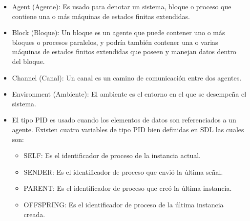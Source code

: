 \begin{itemize}
 \item Agent (Agente): Es usado para denotar un sistema, bloque o 
proceso que contiene una o m\'as m\'aquinas de estados finitas extendidas.
\item Block (Bloque): Un bloque es un agente que puede contener uno o m\'as 
bloques o procesos paralelos, y podr\'ia tambi\'en contener una o varias 
m\'aquinas de estados finitos extendidas que poseen y manejan datos dentro del 
bloque.
\item Channel (Canal): Un canal es un camino de comunicaci\'on entre dos 
agentes.
\item Environment (Ambiente): El ambiente es el entorno en el que se 
desempe\~na el sistema. 

\item El tipo PID es usado cuando los elementos de datos son referenciados 
a un agente. Existen cuatro variables de tipo PID bien definidas en SDL  las cuales 
son:


\begin{itemize}
 \item SELF: Es el identificador de proceso de la instancia actual.
 \item SENDER: Es el identificador de proceso que envi\'o la \'ultima se\~nal.
 \item PARENT: Es el identificador de proceso que cre\'o la \'ultima instancia.
 \item OFFSPRING: Es el identificador de proceso de la \'ultima instancia 
creada.

\end{itemize}


\end{itemize}
